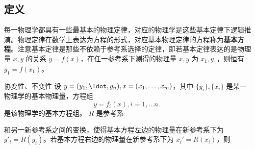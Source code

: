 \subsection{定义}
每一物理学都具有一些最基本的物理定律，对应的物理学是这些基本定律下逻辑推演。物理定律在数学上表达为方程的形式，对应基本物理定律的方程称为\textbf{基本方程}。注意基本定律是那些不依赖于参考系选择的定律，即若基本定律表达的是物理量 $x,y$ 的关系 $y=f(x)$，在任一参考系下测得的物理量 $x,y$ 为 $x_1,y_1$，则恒有 $y_1=f(x_1)$。
\begin{definition}{协变性、不变性}
设 $y=(y_1,\ldot,y_n),x=(x_1,\ldots,x_m)$，其中 $\{y_i\},\{x_i\}$ 是某一物理学的基本物理量，方程组
\begin{equation}
y= f_i(x),i=1,\ldots n.~
\end{equation}
是该物理学的基本方程组。 $R$ 是参考系

和另一新参考系之间的变换，使得基本方程左边的物理量在新参考系下为 $y'_i=R(y_i)$。若基本方程右边的物理量在新参考系下为 $x_i'=R(x_i)$，则

\end{definition}















